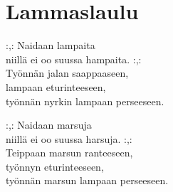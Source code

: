 \section{Lammaslaulu}
:,: Naidaan lampaita\\
niillä ei oo suussa hampaita. :,:\\
Työnnän jalan saappaaseen,\\
lampaan eturinteeseen,\\
työnnän nyrkin lampaan perseeseen.

:,: Naidaan marsuja\\
niillä ei oo suussa harsuja. :,:\\
Teippaan marsun ranteeseen,\\
työnnyn eturinteeseen,\\
työnnän marsun lampaan perseeseen.